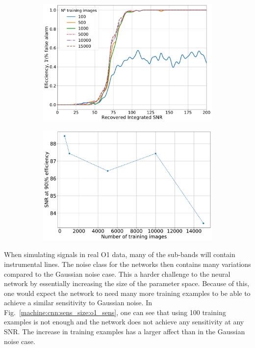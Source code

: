 \begin{figure}[h]
	\begin{subfigure}[h]{0.5\textwidth}
		\includegraphics[width=\linewidth]{C4_cnn/gauss_sens_with_trainnum_eff.pdf}
		\caption{}
	\end{subfigure}
	\begin{subfigure}[h]{0.5\textwidth}
		\includegraphics[width=\linewidth]{C4_cnn/gauss_sens_with_trainnum.pdf}
		\caption{}
	\end{subfigure}
	\caption{}
	\label{machine:cnn:sens_size:gauss_sens}
\end{figure}

When simulating signals in real O1 data, many of the sub-bands will contain instrumental lines. 
The noise class for the networks then contains many variations compared to the Gaussian noise case. 
This a harder challenge to the neural network by essentially increasing the size of the parameter space.
Because of this, one would expect the network to need many more training examples to be able to achieve a similar sensitivity to Gaussian noise.
In Fig.~\ref{machine:cnn:sens_size:o1_sens}, one can see that using 100 training examples is not enough and the network does not achieve any sensitivity at any \ac{SNR}.
The increase in training examples has a larger affect than in the Gaussian noise case. 



